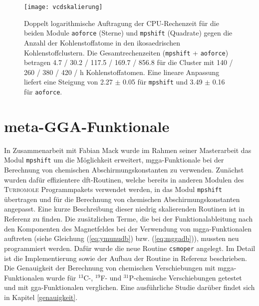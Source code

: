 \begin{figure}[ht!]
	\centering
	\texttt{[image: vcdskalierung]}
	\captionsetup{figurewithin = chapter}
	\captionsetup{font=small, labelfont=bf}\caption[Skalierung von \texttt{mpshift} und \texttt{aoforce}]{Doppelt logarithmische Auftragung der CPU-Rechenzeit für die beiden Module \texttt{aoforce} (Sterne) und \texttt{mpshift} (Quadrate) gegen die Anzahl der Kohlen\-stoff\-ato\-me in den ikosaedrischen Kohlenstoffclustern. Die Gesamtrechenzeiten (\texttt{mpshift} + \texttt{aoforce}) betragen 4.7 / 30.2 / 117.5 / 169.7 / 856.8 für die Cluster mit 140 / 260 / 380 / 420 / \unit[620]{h} Kohlenstoffatomen. Eine lineare Anpassung liefert eine Steigung von 2.27 $\pm$ 0.05 für \texttt{mpshift} und 3.49 $\pm$ 0.16 für \texttt{aoforce}.}
\label{abb:vcdskalierung}
\end{figure}
	
\section{meta-GGA-Funktionale}\label{kap:mgga}
In Zusammenarbeit mit Fabian Mack wurde im Rahmen seiner Masterarbeit das Modul \texttt{mpshift} um die Möglichkeit erweitert, \ac{mgga}-Funktionale bei der Berechnung von chemischen Abschirmungskonstanten zu verwenden. Zunächst wurden dafür effizientere \ac{dft}-Routinen, welche bereits in anderen Modulen des \textsc{Turbomole} Programmpakets verwendet werden, in das Modul \texttt{mpshift} übertragen und für die Berechnung von chemischen Abschirmungskonstanten angepasst. Eine kurze Beschreibung dieser niedrig skalierenden Routinen ist in Referenz \cite{deglmann2002efficient} zu finden. Die zusätzlichen Terme, die bei der Funktionalableitung nach den Komponenten des Magnetfeldes bei der Verwendung von \ac{mgga}-Funktionalen auftreten (siehe Gleichung (\ref{eq:ymunudb}) bzw. (\ref{eq:mggadb})), mussten neu programmiert werden. Dafür wurde die neue Routine \texttt{csmoper} angelegt. Im Detail ist die Implementierung sowie der Aufbau der Routine in Referenz \cite{mack2017} beschrieben. Die Genauigkeit der Berechnung von chemischen Verschiebungen mit \ac{mgga}-Funktionalen wurde für $^{13}$C-, $^{19}$F- und $^{31}$P-chemische Verschiebungen getestet und mit \ac{gga}-Funktionalen verglichen.\supercite{reiter2017calculation} Eine ausführliche Studie darüber findet sich in Kapitel \ref{genauigkeit}.
	
	